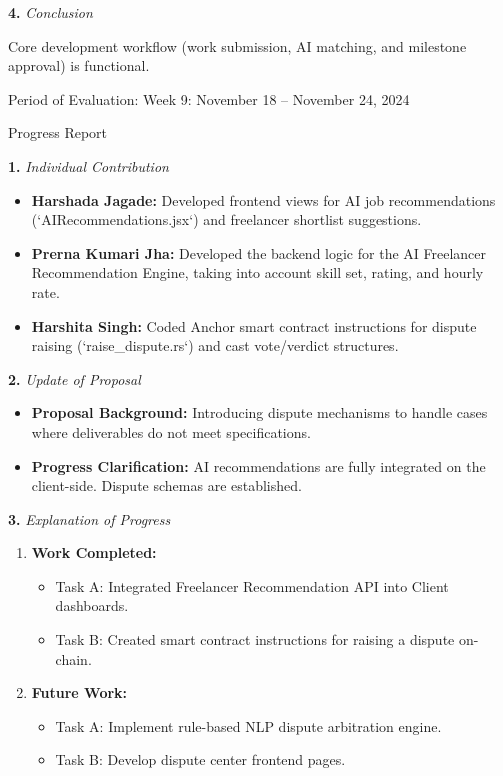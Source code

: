\documentclass[12pt]{article}
\newcommand{\phasetitle}[1]{{\large Period of Evaluation: #1}\par\vspace{4pt}}
\newcommand{\progressreport}{{\large Progress Report}\par\vspace{4pt}}
\newcommand{\subhead}[2]{\textbf{#1.} \textit{#2}\par}
\begin{document}
\subhead{4}{Conclusion}
Core development workflow (work submission, AI matching, and milestone approval) is functional.

\newpage

\phasetitle{Week 9: November 18 -- November 24, 2024}

\progressreport

\subhead{1}{Individual Contribution}
\begin{itemize}[leftmargin=2em]
    \item \textbf{Harshada Jagade:} Developed frontend views for AI job recommendations (`AIRecommendations.jsx`) and freelancer shortlist suggestions.
    \item \textbf{Prerna Kumari Jha:} Developed the backend logic for the AI Freelancer Recommendation Engine, taking into account skill set, rating, and hourly rate.
    \item \textbf{Harshita Singh:} Coded Anchor smart contract instructions for dispute raising (`raise\_dispute.rs`) and cast vote/verdict structures.
\end{itemize}

\subhead{2}{Update of Proposal}
\begin{itemize}[leftmargin=2em]
    \item \textbf{Proposal Background:} Introducing dispute mechanisms to handle cases where deliverables do not meet specifications.
    \item \textbf{Progress Clarification:} AI recommendations are fully integrated on the client-side. Dispute schemas are established.
\end{itemize}

\newpage

\subhead{3}{Explanation of Progress}
\begin{enumerate}[leftmargin=2em]
    \item \textbf{Work Completed:}
    \begin{itemize}[leftmargin=2em]
        \item Task A: Integrated Freelancer Recommendation API into Client dashboards.
        \item Task B: Created smart contract instructions for raising a dispute on-chain.
    \end{itemize}
    \item \textbf{Future Work:}
    \begin{itemize}[leftmargin=2em]
        \item Task A: Implement rule-based NLP dispute arbitration engine.
        \item Task B: Develop dispute center frontend pages.
    \end{itemize}
\end{enumerate}
\end{document}
